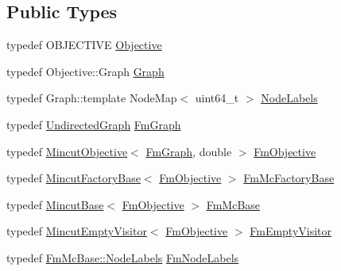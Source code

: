\subsection*{Public Types}
\begin{DoxyCompactItemize}
\item 
typedef O\+B\+J\+E\+C\+T\+I\+V\+E \hyperlink{classnifty_1_1graph_1_1mincut_1_1MincutCcFusionMove_a68c8abc0a1e335fb407edaff75a92896}{Objective}
\item 
typedef Objective\+::\+Graph \hyperlink{classnifty_1_1graph_1_1mincut_1_1MincutCcFusionMove_aa810246258c76c9b2e0a9f59310a0e6a}{Graph}
\item 
typedef Graph\+::template Node\+Map$<$ uint64\+\_\+t $>$ \hyperlink{classnifty_1_1graph_1_1mincut_1_1MincutCcFusionMove_a3f1635f715806dd64d352663dfbe8ee5}{Node\+Labels}
\item 
typedef \hyperlink{classnifty_1_1graph_1_1UndirectedGraph}{Undirected\+Graph} \hyperlink{classnifty_1_1graph_1_1mincut_1_1MincutCcFusionMove_a0c57954c08357717ac192ee1836f15b1}{Fm\+Graph}
\item 
typedef \hyperlink{classnifty_1_1graph_1_1MincutObjective}{Mincut\+Objective}$<$ \hyperlink{classnifty_1_1graph_1_1mincut_1_1MincutCcFusionMove_a0c57954c08357717ac192ee1836f15b1}{Fm\+Graph}, double $>$ \hyperlink{classnifty_1_1graph_1_1mincut_1_1MincutCcFusionMove_a3014c9b5a32f7f4ba0d237a76855ea53}{Fm\+Objective}
\item 
typedef \hyperlink{classnifty_1_1graph_1_1MincutFactoryBase}{Mincut\+Factory\+Base}$<$ \hyperlink{classnifty_1_1graph_1_1mincut_1_1MincutCcFusionMove_a3014c9b5a32f7f4ba0d237a76855ea53}{Fm\+Objective} $>$ \hyperlink{classnifty_1_1graph_1_1mincut_1_1MincutCcFusionMove_a6246ad240ba42965159b1186402d8394}{Fm\+Mc\+Factory\+Base}
\item 
typedef \hyperlink{classnifty_1_1graph_1_1MincutBase}{Mincut\+Base}$<$ \hyperlink{classnifty_1_1graph_1_1mincut_1_1MincutCcFusionMove_a3014c9b5a32f7f4ba0d237a76855ea53}{Fm\+Objective} $>$ \hyperlink{classnifty_1_1graph_1_1mincut_1_1MincutCcFusionMove_a837067e538884c816f5f2753a9ebcb30}{Fm\+Mc\+Base}
\item 
typedef \hyperlink{namespacenifty_1_1graph_ac52f1f3f31061d1a6130a80e7a11e0e0}{Mincut\+Empty\+Visitor}$<$ \hyperlink{classnifty_1_1graph_1_1mincut_1_1MincutCcFusionMove_a3014c9b5a32f7f4ba0d237a76855ea53}{Fm\+Objective} $>$ \hyperlink{classnifty_1_1graph_1_1mincut_1_1MincutCcFusionMove_ab4667dee59d09f81cb8749d0eb89943e}{Fm\+Empty\+Visitor}
\item 
typedef \hyperlink{classnifty_1_1graph_1_1MincutBase_a9dc6555e37d38de23f194f87ca1497d5}{Fm\+Mc\+Base\+::\+Node\+Labels} \hyperlink{classnifty_1_1graph_1_1mincut_1_1MincutCcFusionMove_a5b3284792834859af236031c18ee1c6d}{Fm\+Node\+Labels}
\end{DoxyCompactItemize}

